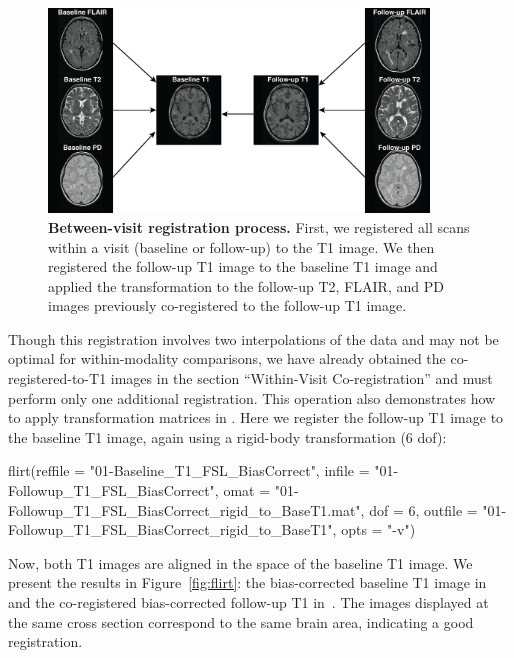 \begin{figure}
\centering
\includegraphics[width = 0.9\textwidth]{Reg_Figure_Option1.png}
\caption[{\bf Between-visit registration process.}]{{\bf Between-visit registration process.}  First, we registered all scans within a visit (baseline or follow-up) to the T1 image.  We then registered the follow-up T1 image to the baseline T1 image and applied the transformation to the follow-up T2, FLAIR, and PD images previously co-registered to the follow-up T1 image. }
\label{fig:reg}
\end{figure}

Though this registration involves two interpolations of the data and may not be optimal for within-modality comparisons, we have already obtained the co-registered-to-T1 images in the section ``Within-Visit Co-registration'' and must perform only one additional registration.  This operation also demonstrates how to apply transformation matrices in .  Here we register the follow-up T1 image to the baseline T1 image, again using a rigid-body transformation (6 dof):

\gobblepars
\begin{Schunk}
\begin{Sinput}
flirt(reffile = "01-Baseline_T1_FSL_BiasCorrect", 
      infile = "01-Followup_T1_FSL_BiasCorrect", 
      omat = "01-Followup_T1_FSL_BiasCorrect_rigid_to_BaseT1.mat", 
      dof = 6,
      outfile = "01-Followup_T1_FSL_BiasCorrect_rigid_to_BaseT1", 
      opts = "-v")
\end{Sinput}
\end{Schunk}
\gobblepars


Now, both T1 images are aligned in the space of the baseline T1 image.  We present the results in Figure~\ref{fig:flirt}: the bias-corrected baseline T1 image in~\protect{} and the co-registered bias-corrected follow-up T1 in~\protect{}.   The images displayed at the same cross section correspond to the same brain area, indicating a good registration.




